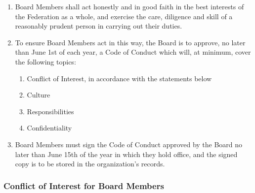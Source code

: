 \begin{enumerate}
 \item
  Board Members shall act honestly and in good faith in the best interests of the Federation as a whole, and exercise the care, diligence and skill of a reasonably prudent person in carrying out their duties.
 \item
  To ensure Board Members act in this way, the Board is to approve, no later than June 1st of each year, a Code of Conduct which will, at minimum, cover the following topics:

  \begin{enumerate}
   \item
    Conflict of Interest, in accordance with the statements below
   \item
    Culture
   \item
    Responsibilities
   \item
    Confidentiality
  \end{enumerate}

 \item
  Board Members must sign the Code of Conduct approved by the Board no later than June 15th of the year in which they hold office, and the signed copy is to be stored in the organization's records.
\end{enumerate}

\subsubsection{Conflict of Interest for Board Members}
\label{conflict-of-interest-for-board-members}

